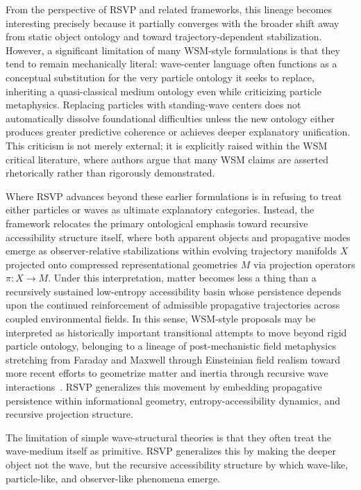 \documentclass[12pt,a4paper]{article}
\begin{document}
From the perspective of RSVP and related frameworks, this lineage becomes interesting precisely because it partially converges with the broader shift away from static object ontology and toward trajectory-dependent stabilization. However, a significant limitation of many WSM-style formulations is that they tend to remain mechanically literal: wave-center language often functions as a conceptual substitution for the very particle ontology it seeks to replace, inheriting a quasi-classical medium ontology even while criticizing particle metaphysics. Replacing particles with standing-wave centers does not automatically dissolve foundational difficulties unless the new ontology either produces greater predictive coherence or achieves deeper explanatory unification. This criticism is not merely external; it is explicitly raised within the WSM critical literature, where authors argue that many WSM claims are asserted rhetorically rather than rigorously demonstrated.

Where RSVP advances beyond these earlier formulations is in refusing to treat either particles or waves as ultimate explanatory categories. Instead, the framework relocates the primary ontological emphasis toward recursive accessibility structure itself, where both apparent objects and propagative modes emerge as observer-relative stabilizations within evolving trajectory manifolds \(X\) projected onto compressed representational geometries \(M\) via projection operators \(\pi : X \to M\). Under this interpretation, matter becomes less a thing than a recursively sustained low-entropy accessibility basin whose persistence depends upon the continued reinforcement of admissible propagative trajectories across coupled environmental fields. In this sense, WSM-style proposals may be interpreted as historically important transitional attempts to move beyond rigid particle ontology, belonging to a lineage of post-mechanistic field metaphysics stretching from Faraday and Maxwell through Einsteinian field realism toward more recent efforts to geometrize matter and inertia through recursive wave interactions~\cite{faraday1855,maxwell1873,einstein1905,einstein1916}. RSVP generalizes this movement by embedding propagative persistence within informational geometry, entropy-accessibility dynamics, and recursive projection structure.

The limitation of simple wave-structural theories is that they often treat the wave-medium itself as primitive. RSVP generalizes this by making the deeper object not the wave, but the recursive accessibility structure by which wave-like, particle-like, and observer-like phenomena emerge.
\end{document}
